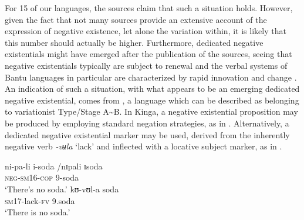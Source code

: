 \documentclass[output=paper,draft,draftmode,colorlinks,citecolor=brown]{langscibook}
\begin{document}
%
For 15
of our languages, the sources claim that such a situation
holds. However, given the fact that not many sources provide an extensive
account of the expression of negative existence, let alone the variation
within, it is likely that this number should actually be higher. Furthermore,
dedicated negative existentials might have emerged after the publication of
the sources, seeing that negative existentials typically are subject to
renewal \citep{Veselinova2016} and the verbal systems of Bantu languages in particular are
characterized by rapid innovation and change \citep[25]{Nurse2008}. An
indication of such a situation, with what appears to be an emerging
dedicated negative existential, comes from , a language which
can be described as belonging to variationist Type\slash Stage
A{\textasciitilde}B. In Kinga, a negative existential proposition may be
produced by employing standard negation strategies, as in
. Alternatively, a dedicated negative existential
marker may be used, derived from the inherently negative verb
\textit{-vʉla} `lack' and inflected with a locative subject marker, as in
.  
%

\ea\label{ex:kinga-soda}  \ea\label{ex:kinga-soda-1} 
\gll ni-pa-li i-soda \op{\textasciitilde}/nɪpali ɪsoda\cp\\ 
\textsc{neg-sm16-cop} \textsc{9-}soda\\
\glt 	`There's no soda.'
\ex\label{ex:kinga-soda-2}
\gll kʊ{}-vʊl-a
soda\\ \textsc{sm}17-lack-\textsc{fv} 9.soda\\
\glt 	`There is no soda.'
\z
\z
\end{document}
